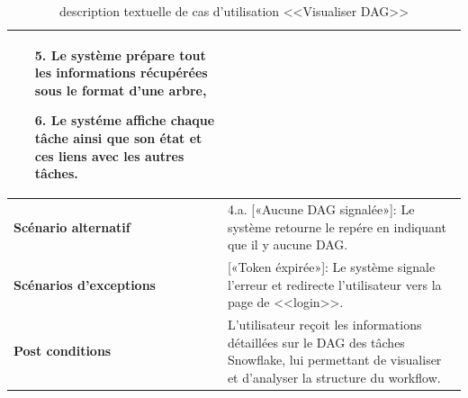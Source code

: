 \begin{enumerate}
\begin{table}[H]
\begin{tabular}{|p{3.5cm}|p{12cm}|}
\begin{enumerate}
                        \item [5.] Le système prépare tout les informations récupérées sous le format d'une arbre,
                        \item [6.] Le systéme affiche chaque tâche ainsi que son état et ces liens avec les autres tâches.
                    \end{enumerate}\\
                        \hline \textbf{Scénario alternatif} & 
                   4.a. \hspace{0.3cm} [«Aucune DAG signalée»]: Le système retourne le repére en indiquant que il y aucune DAG.\\
                \hline  \textbf{Scénarios d'exceptions} & 
                  [«Token éxpirée»]: Le système signale l'erreur et redirecte l'utilisateur vers la page de <<login>>.\\
                \hline \textbf{Post conditions} & L'utilisateur reçoit les informations détaillées sur le DAG des tâches Snowflake, lui permettant de visualiser et d'analyser la structure du workflow.\\
                \hline 
            \end{tabular}
        \caption{description textuelle de cas d'utilisation <<Visualiser DAG>>}
        \end{table}
\end{enumerate}
